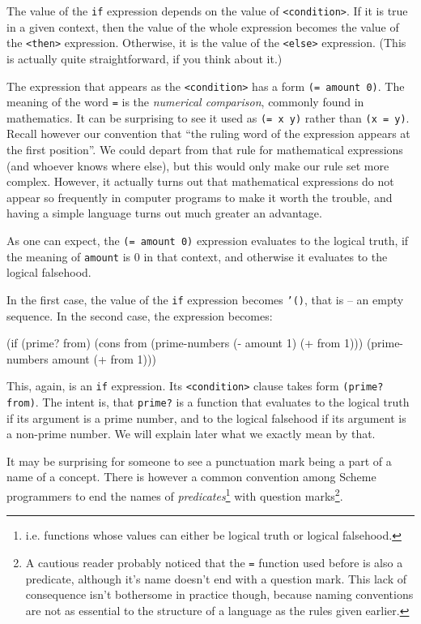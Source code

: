 The value of the \texttt{if} expression depends on the value
of \texttt{<condition>}. If it is true in a given context, then
the value of the whole expression becomes the value of the 
\texttt{<then>} expression. Otherwise, it is the value of the
\texttt{<else>} expression. (This is actually quite straightforward,
if you think about it.)

The expression that appears as the \texttt{<condition>} has 
a form \texttt{(= amount 0)}. The meaning of the word \texttt{=} is
the \textit{numerical comparison}, commonly found in mathematics. It
can be surprising to see it used as \texttt{(= x y)} rather
than \texttt{(x = y)}. Recall however our convention that
``the ruling word of the expression appears at the first
position''. We could depart from that rule for mathematical
expressions (and whoever knows where else), but this would
only make our rule set more complex. However, it actually
turns out that mathematical expressions do not appear so
frequently in computer programs to make it worth the trouble,
and having a simple language turns out much greater an
advantage.

As one can expect, the \texttt{(= amount 0)} expression evaluates
to the logical truth, if the meaning of \texttt{amount} is 0 in that
context, and otherwise it evaluates to the logical falsehood.

In the first case, the value of the \texttt{if} expression
becomes \texttt{'()}, that is -- an empty sequence. In the
second case, the expression becomes:

\begin{Snippet}
(if (prime? from)
  (cons from (prime-numbers (- amount 1) (+ from 1)))
  (prime-numbers amount (+ from 1)))
\end{Snippet}

This, again, is an \texttt{if} expression. Its \texttt{<condition>}
clause takes form \texttt{(prime? from)}. The intent is, that
\texttt{prime?} is a function that evaluates to the logical
truth if its argument is a prime number, and to the logical
falsehood if its argument is a non-prime number. We will explain
later what we exactly mean by that.

It may be surprising for someone to see a punctuation mark
being a part of a name of a concept. There is however a common
convention among Scheme programmers to end the names of
\textit{predicates}\footnote{i.e. functions whose values can either
be logical truth or logical falsehood.} with question marks\footnote{
A cautious reader probably noticed that the \texttt{=} function
used before is also a predicate, although it's name doesn't end
with a question mark.
This lack of consequence isn't bothersome in practice though, because
naming conventions are not as essential to the structure of a language
as the rules given earlier.}.

